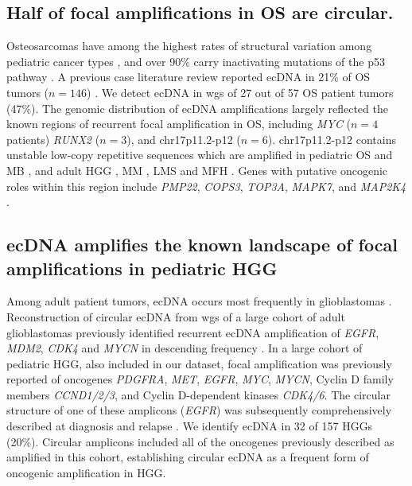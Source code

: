 \subsection{Half of focal amplifications in \acrlong{OS} are circular.}
Osteosarcomas have among the highest rates of structural variation among pediatric cancer types \cite{pcgp}, and over 90\% carry inactivating mutations of the p53 pathway \cite{chen_2014}. A previous case literature review reported ecDNA in 21\% of OS tumors ($n=146$) \cite{gebhart_2005}. We detect ecDNA in \gls{wgs} of 27 out of 57 OS patient tumors (47\%). The genomic distribution of ecDNA amplifications largely reflected the known regions of recurrent focal amplification in OS, including \textit{MYC} ($n=4$ patients) \textit{RUNX2} ($n=3$), and chr17p11.2-p12 ($n=6$). chr17p11.2-p12 contains unstable low-copy repetitive sequences which are amplified in pediatric  \gls{OS} \cite{van_dartel_2002} and \gls{MB} \cite{Chapman}, and adult \gls{HGG} \cite{van_dartel_2003}, \gls{MM} \cite{fabris_2007}, \gls{LMS} and \gls{MFH} \cite{kaur_2007}. Genes with putative oncogenic roles within this region include \textit{PMP22}, \textit{COPS3}, \textit{TOP3A}, \textit{MAPK7}, and \textit{MAP2K4} \cite{van_dartel_2002}. 

\subsection{ecDNA amplifies the known landscape of focal amplifications in pediatric \acrfull{HGG}}
Among adult patient tumors, ecDNA occurs most frequently in glioblastomas \cite{Kim_2020}. Reconstruction of circular ecDNA from \gls{wgs} of a large cohort of adult glioblastomas previously identified recurrent ecDNA amplification of \textit{EGFR}, \textit{MDM2}, \textit{CDK4} and \textit{MYCN} in descending frequency \cite{sanborn_2013}. In a large cohort of pediatric \gls{HGG}, also included in our dataset, focal amplification was previously reported of oncogenes \textit{PDGFRA}, \textit{MET}, \textit{EGFR}, \textit{MYC}, \textit{MYCN}, Cyclin D family members \textit{CCND1/2/3}, and Cyclin D-dependent kinases \textit{CDK4/6}. The circular structure of one of these amplicons (\textit{EGFR}) was subsequently comprehensively described at diagnosis and relapse \cite{xu_2019}. We identify ecDNA in 32 of 157 \glspl{HGG} (20\%). Circular amplicons included all of the oncogenes previously described as amplified in this cohort, establishing  circular ecDNA as a frequent form of oncogenic amplification in \gls{HGG}.

